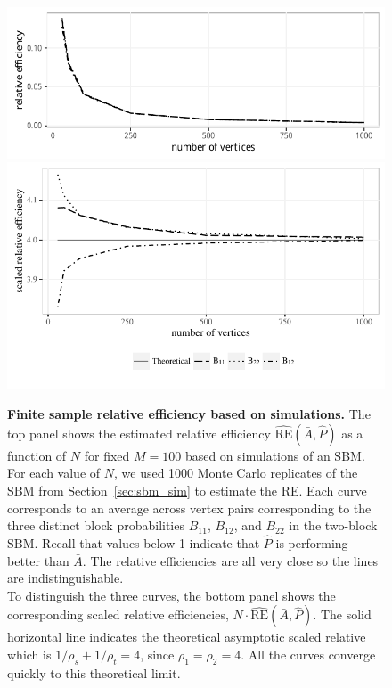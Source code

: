 \documentclass[10pt,letterpaper]{article}
\renewcommand{\hat}{\widehat}
\begin{document}
\begin{figure}[!htbp]
    \centering
    \includegraphics[width=1\textwidth]{RE.pdf}
    \includegraphics[width=1\textwidth]{scaled_RE.pdf}
    \caption{{\bf Finite sample relative efficiency based on simulations. }
    The top panel shows the estimated relative efficiency $\hat{\mathrm{RE}}(\bar{A},\hat{P})$ as a function of $N$ for fixed $M=100$ based on simulations of an SBM. 
    For each value of $N$, we used 1000 Monte Carlo replicates of the SBM from Section~\ref{sec:sbm_sim} to estimate the RE.
    Each curve corresponds to an average across vertex pairs corresponding to the three distinct block probabilities $B_{11}$, $B_{12}$, and $B_{22}$ in the two-block SBM.
    Recall that values below 1 indicate that $\hat{P}$ is performing better than $\bar{A}$.
    The relative efficiencies are all very close so the lines are indistinguishable. \\
    To distinguish the three curves, the bottom panel shows the corresponding scaled relative efficiencies, $N\cdot \hat{\mathrm{RE}}(\bar{A},\hat{P})$.
    The solid horizontal line indicates the theoretical asymptotic scaled relative which is  $1/\rho_s+1/\rho_t=4$, since $\rho_1=\rho_2=4$.
    All the curves converge quickly to this theoretical limit. }
    \label{fig:RE}
\end{figure}
\end{document}
